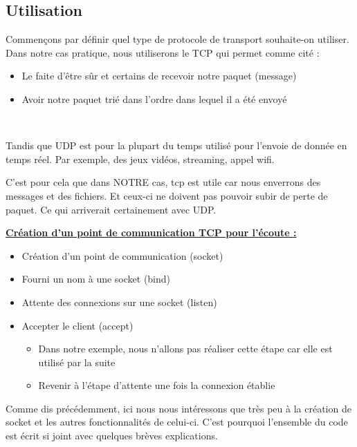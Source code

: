 \subsection{Utilisation}

Commençons par définir quel type de protocole de transport souhaite-on utiliser. Dans notre cas pratique, nous utiliserons le TCP qui permet comme cité :
\begin{itemize}
    \item Le faite d'être sûr et certains de recevoir notre paquet (message)
    \item Avoir notre paquet trié dans l'ordre dans lequel il a été envoyé
\end{itemize} \hfill \\ \par

Tandis que UDP est pour la plupart du temps utilisé pour l'envoie de donnée en temps réel. Par exemple, des jeux vidéos, streaming, appel wifi. \\ \par

C'est pour cela que dans NOTRE cas, tcp est utile car nous enverrons des messages et des fichiers. Et ceux-ci ne doivent pas pouvoir subir de perte de paquet. Ce qui arriverait certainement avec UDP.


\underline{\textbf{Création d'un point de communication TCP pour l'écoute :}}
\begin{itemize}
    \item Création d'un point de communication (socket)
    \item Fourni un nom à une socket (bind)
    \item Attente des connexions sur une socket (listen)
    \item Accepter le client (accept)
    \begin{itemize}
        \item Dans notre exemple, nous n'allons pas réaliser cette étape car elle est utilisé par la suite
        \item Revenir à l'étape d'attente une fois la connexion établie
    \end{itemize} 
\end{itemize}
Comme dis précédemment, ici nous nous intéressons que très peu à la création de socket et les autres fonctionnalités de celui-ci. C'est pourquoi l'ensemble du code est écrit si joint avec quelques brèves explications. \\ \\

